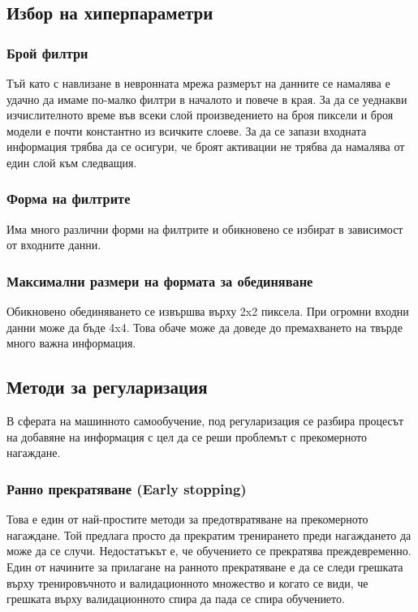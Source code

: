 \subsection{Избор на хиперпараметри}
\subsubsection{Брой филтри}
Тъй като с навлизане в невронната мрежа размерът на данните се намалява е удачно да имаме по-малко филтри в началото и повече в края. За да се уеднакви изчислителното време във всеки слой произведението на броя пиксели и броя модели е почти константно из всичките слоеве. За да се запази входната информация трябва да се осигури, че броят активации не трябва да намалява от един слой към следващия.

\subsubsection{Форма на филтрите}
Има много различни форми на филтрите и обикновено се избират в зависимост от входните данни.

\subsubsection{Максимални размери на формата за обединяване}
Обикновено обединяването се извършва върху 2x2 пиксела. При огромни входни данни може да бъде 4x4. Това обаче може да доведе до премахването на твърде много важна информация.

\subsection{Методи за регуларизация}

В сферата на машинното самообучение, под регуларизация се разбира процесът на добавяне на информация с цел да се реши проблемът с прекомерното нагаждане.

\subsubsection{Ранно прекратяване (Early stopping)}
Това е един от най-простите методи за предотвратяване на прекомерното нагаждане. Той предлага просто да прекратим тренирането преди нагаждането да може да се случи. Недостатъкът е, че обучението се прекратява преждевременно. Един от начините за прилагане на ранното прекратяване е да се следи грешката върху тренировъчното и валидационното множество и когато се види, че грешката върху валидационното спира да пада се спира обучението.


